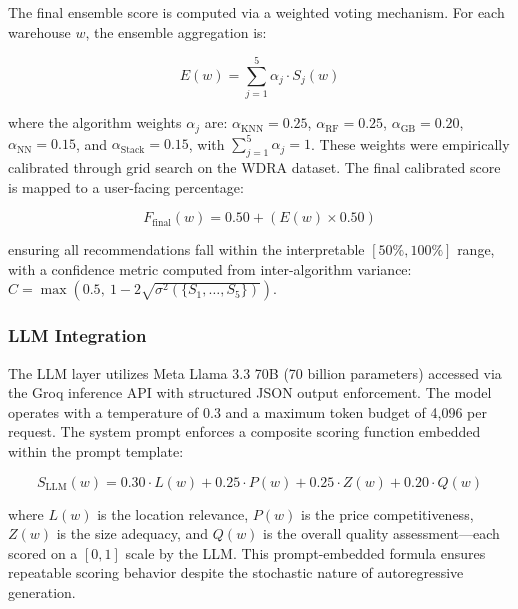\vspace{0.5em}

The final ensemble score is computed via a weighted voting mechanism. For each warehouse $w$, the ensemble aggregation is:

\begin{equation}
E(w) = \sum_{j=1}^{5} \alpha_j \cdot S_j(w)
\label{eq:ensemble}
\end{equation}

\noindent where the algorithm weights $\alpha_j$ are: $\alpha_{\text{KNN}} = 0.25$, $\alpha_{\text{RF}} = 0.25$, $\alpha_{\text{GB}} = 0.20$, $\alpha_{\text{NN}} = 0.15$, and $\alpha_{\text{Stack}} = 0.15$, with $\sum_{j=1}^{5} \alpha_j = 1$. These weights were empirically calibrated through grid search on the WDRA dataset. The final calibrated score is mapped to a user-facing percentage:

\begin{equation}
F_{\text{final}}(w) = 0.50 + \left(E(w) \times 0.50\right)
\label{eq:final_score}
\end{equation}

\noindent ensuring all recommendations fall within the interpretable $[50\%, 100\%]$ range, with a confidence metric computed from inter-algorithm variance:
$C = \max\left(0.5,\ 1 - 2\sqrt{\sigma^2(\{S_1, \ldots, S_5\})}\right)$.

\subsubsection{LLM Integration}

The LLM layer utilizes Meta Llama 3.3 70B (70 billion parameters) accessed via the Groq inference API with structured JSON output enforcement. The model operates with a temperature of 0.3 and a maximum token budget of 4,096 per request. The system prompt enforces a composite scoring function embedded within the prompt template:

\begin{equation}
S_{\text{LLM}}(w) = 0.30 \cdot L(w) + 0.25 \cdot P(w) + 0.25 \cdot Z(w) + 0.20 \cdot Q(w)
\label{eq:llm_composite}
\end{equation}

\noindent where $L(w)$ is the location relevance, $P(w)$ is the price competitiveness, $Z(w)$ is the size adequacy, and $Q(w)$ is the overall quality assessment—each scored on a $[0, 1]$ scale by the LLM. This prompt-embedded formula ensures repeatable scoring behavior despite the stochastic nature of autoregressive generation.

